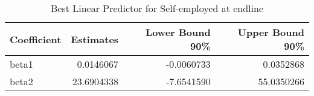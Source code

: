 \begin{table}

\caption{\label{tab:blpQselfempl}Best Linear Predictor for Self-employed at endline}
\centering
\begin{tabular}[t]{lrrr}
\toprule
Coefficient & Estimates & Lower Bound 90\% & Upper Bound 90\%\\
\midrule
beta1 & 0.0146067 & -0.0060733 & 0.0352868\\
beta2 & 23.6904338 & -7.6541590 & 55.0350266\\
\bottomrule
\end{tabular}
\end{table}
